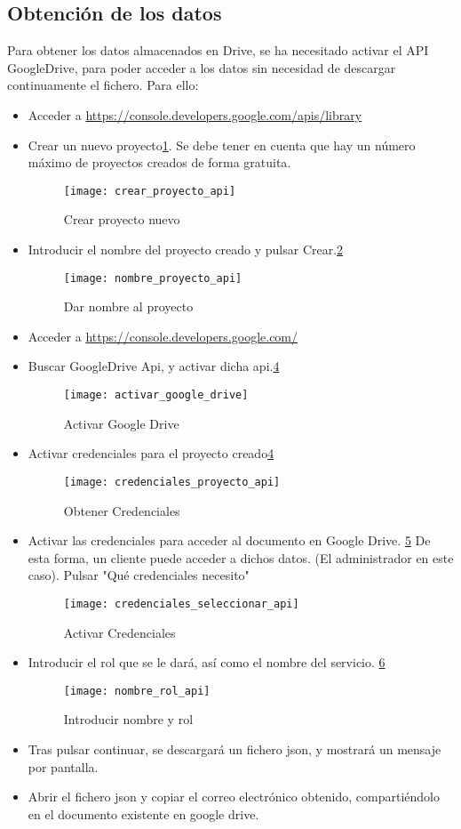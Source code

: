 \subsection{Obtención de los datos}
Para obtener los datos almacenados en Drive, se ha necesitado activar el API GoogleDrive, para poder acceder a los datos sin necesidad de descargar continuamente el fichero. Para ello: 
\begin{itemize}
 
\item Acceder a \url{https://console.developers.google.com/apis/library}
\item Crear un nuevo proyecto\ref{fig:D.1.1}. Se debe tener en cuenta que hay un número máximo de proyectos creados de forma gratuita.
\begin{figure}[h]
\centering
\texttt{[image: crear\_proyecto\_api]}
\caption{Crear proyecto nuevo}
\label{fig:D.1.1}
\end{figure}  
\item Introducir el nombre del proyecto creado y pulsar Crear.\ref{fig:D.1.2} 
\begin{figure}[h]
\centering
\texttt{[image: nombre\_proyecto\_api]}
\caption{Dar nombre al proyecto}
\label{fig:D.1.2}
\end{figure}  
\item Acceder a \url{https://console.developers.google.com/}
\item Buscar GoogleDrive Api, y activar dicha api.\ref{fig:D.1.3} 
\begin{figure}[h]
\centering
\texttt{[image: activar\_google\_drive]}
\caption{Activar Google Drive}
\label{fig:D.1.3}
\end{figure}  
\item Activar credenciales para el proyecto creado\ref{fig:D.1.3} 
\begin{figure}[h]
\centering
\texttt{[image: credenciales\_proyecto\_api]}
\caption{Obtener Credenciales}
\label{fig:D.1.3}
\end{figure}  
\item Activar las credenciales para acceder al documento en Google Drive. \ref{fig:D.1.4} De esta forma, un cliente puede acceder a dichos datos. (El administrador en este caso). Pulsar "Qué credenciales necesito"
\begin{figure}[h]
\centering
\texttt{[image: credenciales\_seleccionar\_api]}
\caption{Activar Credenciales}
\label{fig:D.1.4}
\end{figure}  
\item Introducir el rol que se le dará, así como el nombre del servicio. \ref{fig:D.1.5}
\begin{figure}[h]
\centering
\texttt{[image: nombre\_rol\_api]}
\caption{Introducir nombre y rol}
\label{fig:D.1.5}
\end{figure}
\item Tras pulsar continuar, se descargará un fichero json, y mostrará un mensaje por pantalla. 
\item Abrir el fichero json y copiar el correo electrónico obtenido, compartiéndolo en el documento existente en google drive. 
\end{itemize}
